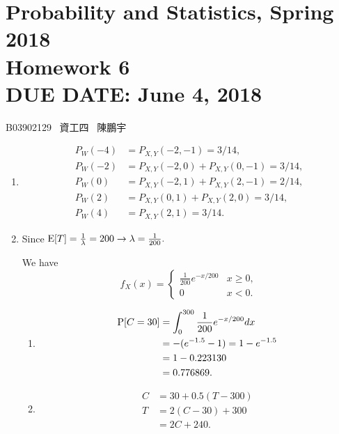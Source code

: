 \documentclass{article}
\newcommand{\hmwkClass}{Probability and Statistics, Spring 2018}
\newcommand{\hmwkTitle}{Homework 6}
\newcommand{\hmwkDueDate}{June 4, 2018}
\begin{document}
\thispagestyle{empty}
\section*{\hmwkClass \\
    \normalsize{\hmwkTitle} \\
    \normalsize{DUE DATE: \hmwkDueDate}
}

\hfill{B03902129 \, 資工四 \, 陳鵬宇}

\begin{enumerate}
    \item [6.1.2]

    \begin{align*}
        P_W(-4) & = P_{X, Y}(-2, -1) = 3 / 14, \\
        P_W(-2) & = P_{X, Y}(-2, 0) + P_{X, Y}(0, -1) = 3 / 14, \\
        P_W(0)  & = P_{X, Y}(-2, 1) + P_{X, Y}(2, -1) = 2 / 14, \\
        P_W(2)  & = P_{X, Y}(0, 1) + P_{X, Y}(2, 0) = 3 / 14, \\
        P_W(4)  & = P_{X, Y}(2, 1) = 3 / 14.
    \end{align*}

    \item [6.3.6]

    Since $\text E[T] = \frac{1}{\lambda} = 200 \to \lambda = \frac{1}{200}.$

    We have $$f_X(x) = \begin{cases}
        \frac{1}{200} e^{-x / 200} & x \ge 0, \\
        0 & x < 0.
    \end{cases}$$

    \begin{enumerate}[label=(\alph*)]
        \item
        \begin{align*}
            \text P[C = 30]
            & = \int_0^{300} \frac{1}{200} e^{-x / 200} dx \\
            & = -(e^{-1.5} - 1) = 1 - e^{-1.5} \\
            & = 1 - 0.223130 \\
            & = 0.776869.
        \end{align*}

        \item

        \begin{align*}
            C & = 30 + 0.5(T - 300) \\
            T & = 2(C - 30) + 300 \\
              & = 2C + 240.
        \end{align*}


\end{enumerate}
\end{enumerate}
\end{document}
